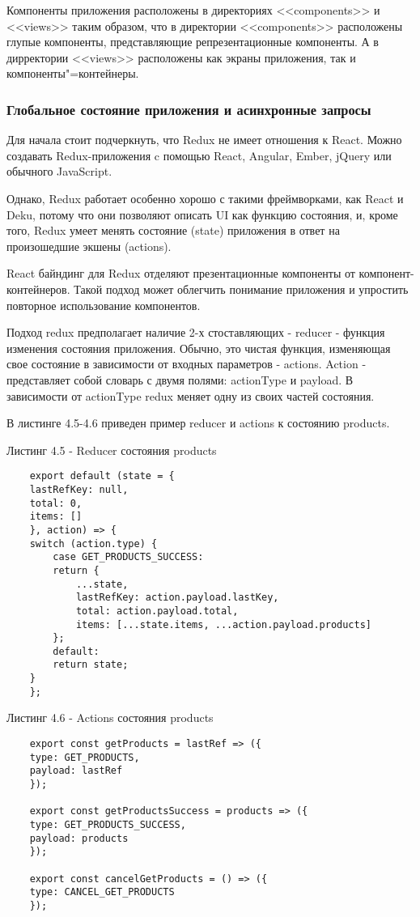 Компоненты приложения расположены в директориях <<components>> и <<views>> таким образом, что в директории <<components>> расположены глупые компоненты, представляющие репрезентационные компоненты.
А в дирректории <<views>> расположены как экраны приложения, так и компоненты"=контейнеры.


\subsubsection{Глобальное состояние приложения и асинхронные запросы}\hfill

Для начала стоит подчеркнуть, что Redux не имеет отношения к React.
Можно создавать Redux-приложения c помощью React, Angular, Ember, jQuery или обычного JavaScript.

Однако, Redux работает особенно хорошо с такими фреймворками, как React и Deku, потому что они позволяют описать UI как функцию состояния, и, кроме того, Redux умеет менять состояние (state) приложения в ответ на произошедшие экшены (actions).

React байндинг для Redux отделяют презентационные компоненты от компонент-контейнеров.
Такой подход может облегчить понимание приложения и упростить повторное использование компонентов.

Подход redux предполагает наличие 2-х стоставляющих - reducer - функция изменения состояния приложения.
Обычно, это чистая функция, изменяющая свое состояние в зависимости от входных параметров - actions.
Action - представляет собой словарь с двумя полями: actionType  и payload.
В зависимости от actionType redux меняет одну из своих частей состояния.

В листинге 4.5-4.6 приведен пример reducer и actions к состоянию products.

Листинг 4.5 - Reducer состояния products
\begin{lstlisting}
    export default (state = {
    lastRefKey: null,
    total: 0,
    items: []
    }, action) => {
    switch (action.type) {
        case GET_PRODUCTS_SUCCESS:
        return {
            ...state,
            lastRefKey: action.payload.lastKey,
            total: action.payload.total,
            items: [...state.items, ...action.payload.products]
        };
        default:
        return state;
    }
    };
\end{lstlisting}

Листинг 4.6 - Actions состояния products
\begin{lstlisting}
    export const getProducts = lastRef => ({
    type: GET_PRODUCTS,
    payload: lastRef
    });

    export const getProductsSuccess = products => ({
    type: GET_PRODUCTS_SUCCESS,
    payload: products
    });

    export const cancelGetProducts = () => ({
    type: CANCEL_GET_PRODUCTS
    });

\end{lstlisting}

